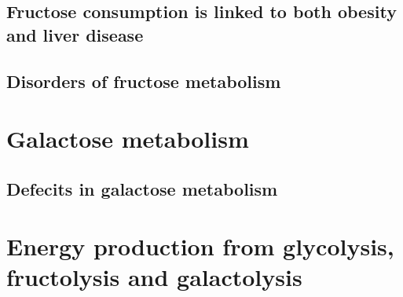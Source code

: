 \documentclass{tufte-handout}
\begin{document}
\subsection{Fructose consumption is linked to both obesity and liver disease}
\subsection{Disorders of fructose metabolism}
\section{Galactose metabolism}
\subsection{Defecits in galactose metabolism}
\section{Energy production from glycolysis, fructolysis and galactolysis}


\end{document}
